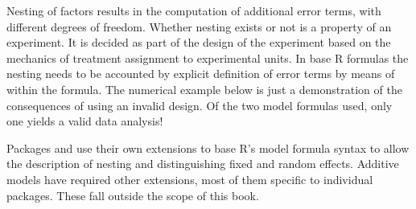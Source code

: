 \documentclass[krantz2]{krantz}\usepackage{knitr}%
\begin{document}
Nesting of factors results in the computation of additional error terms, with different degrees of freedom. Whether nesting exists or not is a property of an experiment. It is decided as part of the design of the experiment based on the mechanics of treatment assignment to experimental units. In base R formulas the nesting needs to be accounted by explicit definition of error terms by means of  within the formula. The numerical example below is just a demonstration of the consequences of using an invalid design. Of the two model formulas used, only one yields a valid data analysis!

\begin{knitrout}\footnotesize
{}\color{fgcolor}\begin{kframe}
\begin{alltt}
 \hlopt{~}  \hlopt{+}  \hlopt{+}  \hlopt{*} 
\end{alltt}
\end{kframe}
\end{knitrout}

Packages  and  use their own extensions to base R's model formula syntax to allow the description of nesting and distinguishing fixed and random effects. Additive models have required other extensions, most of them specific to individual packages. These fall outside the scope of this book.
\end{document}
